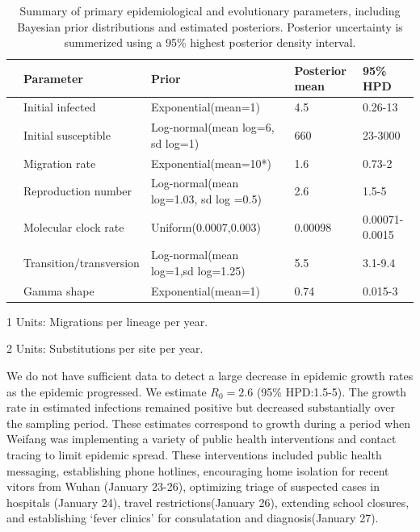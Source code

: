 \documentclass[9pt,lineno,onehalfspacing]{elife}
\begin{document}
\begin{table}[ht]
\begin{fullwidth}
\begin{threeparttable}[b]
\caption{Summary of primary epidemiological and evolutionary parameters, including Bayesian prior distributions and estimated posteriors. Posterior uncertainty is summerized using a 95\% highest posterior density interval. \label{tab:tab1}}
\centering
\begin{tabular}{lllll}
  \hline
 & {\bf Parameter} & {\bf Prior} & {\bf Posterior mean} & \bf{95\% HPD} \\ 
  \hline
 & Initial infected & Exponential(mean=1) & 4.5 & 0.26-13 \\ 
 & Initial susceptible & Log-normal(mean log=6, sd log=1) & 660 & 23-3000 \\ 
 & Migration rate\tnote{1} & Exponential(mean=10*) & 1.6 & 0.73-2 \\ 
 & Reproduction number & Log-normal(mean log=1.03, sd log =0.5) & 2.6 & 1.5-5 \\ 
 & Molecular clock rate\tnote{2} & Uniform(0.0007,0.003) & 0.00098 & 0.00071-0.0015 \\ 
 & Transition/transversion & Log-normal(mean log=1,sd log=1.25) & 5.5 & 3.1-9.4 \\ 
 & Gamma shape & Exponential(mean=1) & 0.74 & 0.015-3 \\ 
   \hline
\end{tabular}
\begin{tablenotes}\item [1] Units: Migrations per lineage per year. \end{tablenotes}
\begin{tablenotes}\item [2] Units: Substitutions per site per year. \end{tablenotes}
\end{threeparttable}
\end{fullwidth}
\end{table}

We do not have sufficient data to detect a large decrease in epidemic growth rates as the epidemic progressed.
We estimate $R_0=2.6$ (95\% HPD:1.5-5). The growth rate in estimated infections remained positive but decreased substantially over the sampling period. 
These estimates correspond to growth during a period when Weifang was implementing a variety of public health interventions and contact tracing to limit epidemic spread.
These interventions included public health messaging, establishing phone hotlines, encouraging home isolation for recent vitors from Wuhan (January 23-26), optimizing triage of suspected cases in hospitals (January 24), travel restrictions(January 26), extending school closures, and establishing `fever clinics' for consulatation and diagnosis(January 27)\citep{Mao2020-qu}. 
\end{document}
